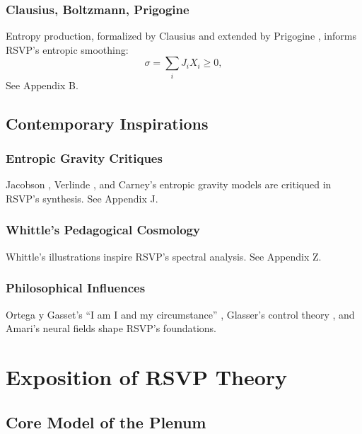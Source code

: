 \documentclass[12pt]{report}
\begin{document}
\section{Clausius, Boltzmann, Prigogine}
Entropy production, formalized by Clausius \citep{Clausius1865} and extended by Prigogine \citep{Prigogine1977}, informs RSVP’s entropic smoothing:
\begin{equation}
\sigma = \sum_i J_i X_i \geq 0, \label{eq:entropy}
\end{equation}
See Appendix B.

\chapter{Contemporary Inspirations}
\section{Entropic Gravity Critiques}
Jacobson \citep{Jacobson1995}, Verlinde \citep{Verlinde2011}, and Carney’s \citep{Carney2019} entropic gravity models are critiqued in RSVP’s synthesis. See Appendix J.
\section{Whittle’s Pedagogical Cosmology}
Whittle’s illustrations \citep{Whittle2008} inspire RSVP’s spectral analysis. See Appendix Z.
\section{Philosophical Influences}
Ortega y Gasset’s “I am I and my circumstance” \citep{Ortega1914}, Glasser’s control theory \citep{Glasser1985}, and Amari’s neural fields \citep{Amari1977} shape RSVP’s foundations.

\part{Exposition of RSVP Theory}

\chapter{Core Model of the Plenum}
\end{document}

